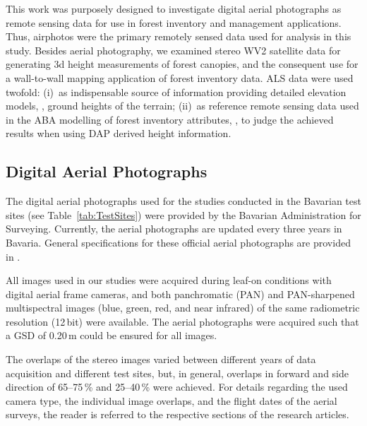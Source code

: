 This work was purposely designed to investigate digital aerial photographs 
as remote sensing data for use in forest inventory and management applications. 
Thus, airphotos were the primary remotely sensed data used for analysis in this study.
Besides aerial photography, we examined stereo \acf{WV2} satellite data for generating 3d height measurements of forest canopies,
and the consequent use for a wall-to-wall mapping application of forest inventory data. 
\ac{ALS} data were used twofold: (i)~as indispensable source of information providing detailed elevation models, \ie, ground heights of the terrain; 
(ii)~as reference remote sensing data used in the \ac{ABA} modelling of forest inventory attributes, 
\ie, to judge the achieved results when using 
\ac{DAP} derived height information.

\subsection{Digital Aerial Photographs}

The  digital aerial photographs
used for the studies conducted in the Bavarian test sites (see Table~\ref{tab:TestSites}) were provided by the 
Bavarian Administration for Surveying. Currently, the aerial photographs are updated every three years in Bavaria.
General specifications for these official aerial photographs are provided in \textcite{LDBV.2015c}.

All images used in our studies were acquired during leaf-on conditions with digital aerial frame cameras, and both 
panchromatic (PAN) and PAN-sharpened multispectral images (blue, green, red, and near infrared) of the same 
radiometric resolution (12\,bit) were available. 
The aerial photographs were acquired such that a \ac{GSD} of 0.20\,m  could be ensured for all images.   

The overlaps 
of the stereo images varied between different years of data acquisition and different test sites,
but, in general, overlaps in forward and side direction of 65--75\,\% and 25--40\,\% were achieved.
For details regarding the used camera type, the individual image overlaps, and the flight dates of the aerial surveys,
the reader is referred to the respective sections of the research articles.

